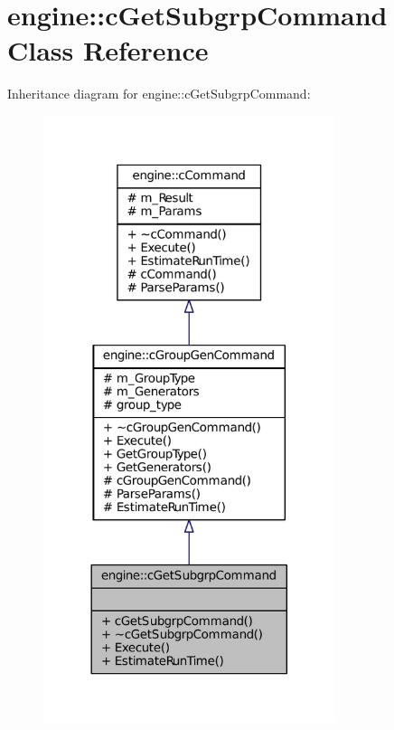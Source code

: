 \hypertarget{classengine_1_1cGetSubgrpCommand}{
\section{engine\-:\-:c\-Get\-Subgrp\-Command \-Class \-Reference}
\label{classengine_1_1cGetSubgrpCommand}
}


\-Inheritance diagram for engine\-:\-:c\-Get\-Subgrp\-Command\-:\nopagebreak
\begin{figure}[H]
\begin{center}
\leavevmode
\includegraphics[width=242pt]{classengine_1_1cGetSubgrpCommand__inherit__graph}
\end{center}
\end{figure}



